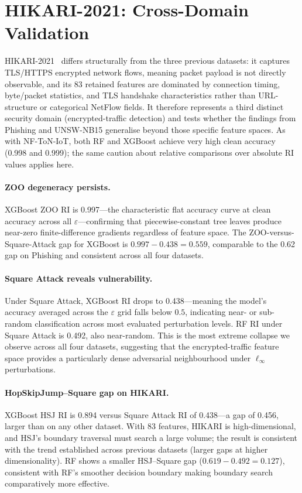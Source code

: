 \documentclass[runningheads]{llncs}
\begin{document}
\section{HIKARI-2021: Cross-Domain Validation}
\label{sec:hikari}

HIKARI-2021~\cite{ferrag2022hikari} differs structurally from the three previous
datasets: it captures TLS/HTTPS encrypted network flows, meaning packet payload is
not directly observable, and its 83 retained features are dominated by connection
timing, byte/packet statistics, and TLS handshake characteristics rather than
URL-structure or categorical NetFlow fields.  It therefore represents a third
distinct security domain (encrypted-traffic detection) and tests whether the
findings from Phishing and UNSW-NB15 generalise beyond those specific feature
spaces.  As with NF-ToN-IoT, both RF and XGBoost achieve very high clean accuracy
(0.998 and 0.999); the same caution about relative comparisons over absolute RI
values applies here.

\paragraph{ZOO degeneracy persists.}
XGBoost ZOO RI is 0.997---the characteristic flat accuracy curve at clean
accuracy across all $\varepsilon$---confirming that piecewise-constant tree leaves
produce near-zero finite-difference gradients regardless of feature space.  The
ZOO-versus-Square-Attack gap for XGBoost is $0.997 - 0.438 = 0.559$, comparable
to the 0.62 gap on Phishing and consistent across all four datasets.

\paragraph{Square Attack reveals vulnerability.}
Under Square Attack, XGBoost RI drops to 0.438---meaning the model's accuracy
averaged across the $\varepsilon$ grid falls below $0.5$, indicating near- or
sub-random classification across most evaluated perturbation levels.
RF RI under Square Attack is 0.492, also near-random.  This is the most extreme
collapse we observe across all four datasets, suggesting that the encrypted-traffic
feature space provides a particularly dense adversarial neighbourhood under
$\ell_\infty$ perturbations.

\paragraph{HopSkipJump--Square gap on HIKARI.}
XGBoost HSJ RI is 0.894 versus Square Attack RI of 0.438---a gap of 0.456, larger
than on any other dataset.  With 83 features, HIKARI is high-dimensional, and
HSJ's boundary traversal must search a large volume; the result is consistent with
the trend established across previous datasets (larger gaps at higher
dimensionality).  RF shows a smaller HSJ--Square gap ($0.619 - 0.492 = 0.127$),
consistent with RF's smoother decision boundary making boundary search
comparatively more effective.
\end{document}
